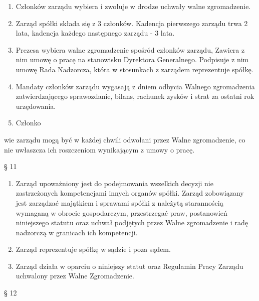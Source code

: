 \documentclass[a4paper, 11pt]{article}
\begin{document}
\begin{enumerate}
\item	Członków zarządu wybiera i zwołuje w drodze uchwały walne zgromadzenie.
\item	Zarząd spółki składa się z 3 członków. Kadencja pierwszego zarządu trwa 2 lata, kadencja każdego następnego zarządu - 3 lata.
\item	Prezesa wybiera walne zgromadzenie spośród członków zarządu, Zawiera z nim umowę o pracę na stanowisku Dyrektora Generalnego. Podpisuje z nim umowę Rada Nadzorcza, która w stosunkach z zarządem reprezentuje spółkę.
\item	Mandaty członków zarządu wygasają z dniem odbycia Walnego zgromadzenia zatwierdzającego sprawozdanie, bilans, rachunek zysków i strat za ostatni rok urzędowania.
\item	Członko
\end{enumerate}
wie zarządu mogą być w każdej chwili odwołani przez Walne zgromadzenie, co nie uwłaszcza ich roszczeniom wynikającym z umowy o pracę.

§ 11\\

\begin{enumerate}
\item	Zarząd upoważniony jest do podejmowania wszelkich decyzji nie zastrzeżonych kompetencjami innych organów spółki.
Zarząd zobowiązany jest zarządzać majątkiem i sprawami spółki z należytą starannością wymaganą w obrocie gospodarczym, przestrzegać praw, postanowień niniejszego statutu oraz uchwał podjętych przez Walne zgromadzenie i radę nadzorczą w granicach ich kompetencji.
\item	Zarząd reprezentuje spółkę w sądzie i poza sądem.
\item	Zarząd działa w oparciu o niniejszy statut oraz Regulamin Pracy Zarządu uchwalony przez Walne Zgromadzenie.

\end{enumerate}

§ 12\\
\end{document}
